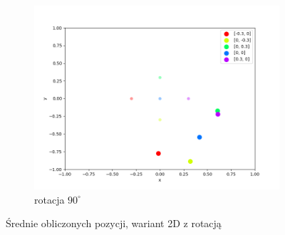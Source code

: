 \begin{figure}[h]
\begin{subfigure}{.5\textwidth}
    \includegraphics[width=\linewidth]{pics/mult_lat_2d_angle/positions_90_mean.png}
\caption{rotacja $90^{\circ}$}
\label{pic:2d_90_angle_mult}
\end{subfigure}
\caption{Średnie obliczonych pozycji, wariant 2D z rotacją}
\label{pic:2d_angle_mult}
\end{figure}


